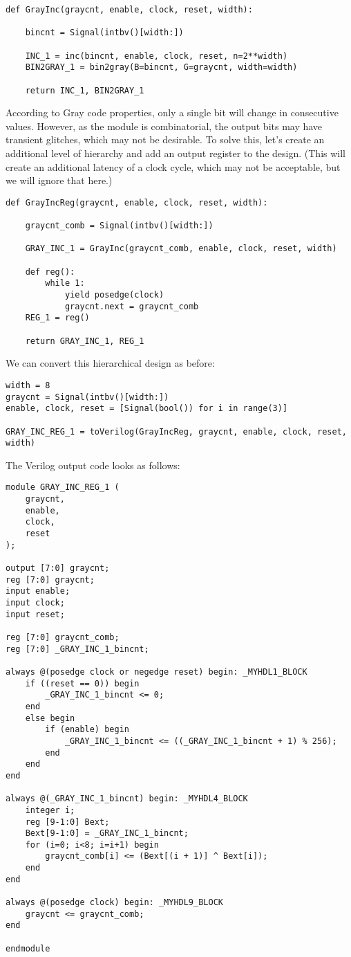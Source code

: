 \begin{verbatim}
def GrayInc(graycnt, enable, clock, reset, width):
    
    bincnt = Signal(intbv()[width:])
    
    INC_1 = inc(bincnt, enable, clock, reset, n=2**width)
    BIN2GRAY_1 = bin2gray(B=bincnt, G=graycnt, width=width)
    
    return INC_1, BIN2GRAY_1
\end{verbatim}

According to Gray code properties, only a single bit
will change in consecutive values. However, as the
 module is combinatorial, the output bits
may have transient glitches, which may not be desirable.
To solve this, let's create an additional level of
hierarchy and add an output register to the design.
(This will create an additional latency of a clock
cycle, which may not be acceptable, but we will
ignore that here.)

\begin{verbatim}
def GrayIncReg(graycnt, enable, clock, reset, width):
    
    graycnt_comb = Signal(intbv()[width:])
    
    GRAY_INC_1 = GrayInc(graycnt_comb, enable, clock, reset, width)
    
    def reg():
        while 1:
            yield posedge(clock)
            graycnt.next = graycnt_comb
    REG_1 = reg()
    
    return GRAY_INC_1, REG_1
\end{verbatim}

We can convert this hierarchical design as before:

\begin{verbatim}
width = 8
graycnt = Signal(intbv()[width:])
enable, clock, reset = [Signal(bool()) for i in range(3)]

GRAY_INC_REG_1 = toVerilog(GrayIncReg, graycnt, enable, clock, reset, width)
\end{verbatim}

The Verilog output code looks as follows:

\begin{verbatim}
module GRAY_INC_REG_1 (
    graycnt,
    enable,
    clock,
    reset
);

output [7:0] graycnt;
reg [7:0] graycnt;
input enable;
input clock;
input reset;

reg [7:0] graycnt_comb;
reg [7:0] _GRAY_INC_1_bincnt;

always @(posedge clock or negedge reset) begin: _MYHDL1_BLOCK
    if ((reset == 0)) begin
        _GRAY_INC_1_bincnt <= 0;
    end
    else begin
        if (enable) begin
            _GRAY_INC_1_bincnt <= ((_GRAY_INC_1_bincnt + 1) % 256);
        end
    end
end

always @(_GRAY_INC_1_bincnt) begin: _MYHDL4_BLOCK
    integer i;
    reg [9-1:0] Bext;
    Bext[9-1:0] = _GRAY_INC_1_bincnt;
    for (i=0; i<8; i=i+1) begin
        graycnt_comb[i] <= (Bext[(i + 1)] ^ Bext[i]);
    end
end

always @(posedge clock) begin: _MYHDL9_BLOCK
    graycnt <= graycnt_comb;
end

endmodule
\end{verbatim}

